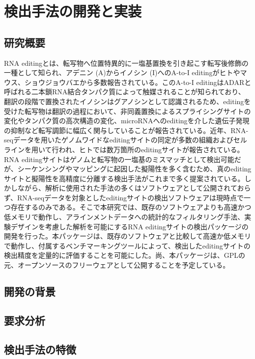 \chapter{検出手法の開発と実装}

\section{研究概要}
RNA editingとは、転写物へ位置特異的に一塩基置換を引き起こす転写後修飾の一種として知られ、アデニン (A)からイノシン (I)へのA-to-I editingがヒトやマウス、ショウジョウバエから多数報告されている。このA-to-I editingはADARと呼ばれる二本鎖RNA結合タンパク質によって触媒されることが知られており、翻訳の段階で置換されたイノシンはグアノシンとして認識されるため、editingを受けた転写物は翻訳の過程において、非同義置換によるスプライシングサイトの変化やタンパク質の高次構造の変化、microRNAへのeditingを介した遺伝子発現の抑制など転写調節に幅広く関与していることが報告されている。近年、RNA-seqデータを用いたゲノムワイドなeditingサイトの同定が多数の組織およびセルラインを用いて行われ、ヒトでは数万箇所のeditingサイトが報告されている。RNA editingサイトはゲノムと転写物の一塩基のミスマッチとして検出可能だが、シーケンシングやマッピングに起因した擬陽性を多く含むため、真のeditingサイトと擬陽性を高精度に分離する検出手法がこれまで多く提案されている。しかしながら、解析に使用された手法の多くはソフトウェアとして公開されておらず、RNA-seqデータを対象としたeditingサイトの検出ソフトウェアは現時点で一つ存在するのみである。そこで本研究では、既存のソフトウェアよりも高速かつ低メモリで動作し、アラインメントデータへの統計的なフィルタリング手法、実験デザインを考慮した解析を可能にするRNA editingサイトの検出パッケージの開発を行った。本パッケージは、既存のソフトウェアと比較して高速か低メモリで動作し、付属するベンチマーキングツールによって、検出したeditingサイトの検出精度を定量的に評価することを可能にした。尚、本パッケージは、GPLの元、オープンソースのフリーウェアとして公開することを予定している。

\section{開発の背景}

\section{要求分析}

\section{検出手法の特徴}


